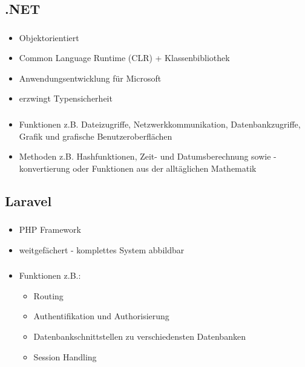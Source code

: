\documentclass[aspectratio=169,14pt,xcolor=dvipsnames]{beamer}
\begin{document}
\subsection{.NET}
\begin{frame}[t]
    \frametitle{\subsecname}
    \framesubtitle{\secname}
    \begin{itemize}
        \setlength{\itemsep}{1.5em}
        \item Objektorientiert
        \item Common Language Runtime (CLR) + Klassenbibliothek
        \item Anwendungsentwicklung für Microsoft
        \item erzwingt Typensicherheit
    \end{itemize}
\end{frame}

\begin{frame}[t]
    \frametitle{\subsecname}
    \framesubtitle{\secname}
    \begin{itemize}
        \setlength{\itemsep}{1.5em}
        \item Funktionen z.B. Dateizugriffe, Netzwerkkommunikation, Datenbankzugriffe, Grafik und grafische Benutzeroberflächen
        \item Methoden z.B. Hashfunktionen, Zeit- und Datumsberechnung sowie -konvertierung oder Funktionen aus der alltäglichen Mathematik
    \end{itemize}
\end{frame}

\subsection{Laravel}
\begin{frame}[t]
    \frametitle{\subsecname}
    \framesubtitle{\secname}
    \begin{itemize}
        \setlength{\itemsep}{1.5em}
        \item PHP Framework
        \item weitgefächert - komplettes System abbildbar
    \end{itemize}
\end{frame}

\begin{frame}[t]
    \frametitle{\subsecname}
    \framesubtitle{\secname}
    \begin{itemize}
        \setlength{\itemsep}{1.5em}
        \item Funktionen z.B.:
        \begin{itemize}
            \setlength{\itemsep}{1.5em}
            \item Routing
            \item Authentifikation und Authorisierung
            \item Datenbankschnittstellen zu verschiedensten Datenbanken
            \item Session Handling
        \end{itemize}
    \end{itemize}
\end{frame}
\end{document}
